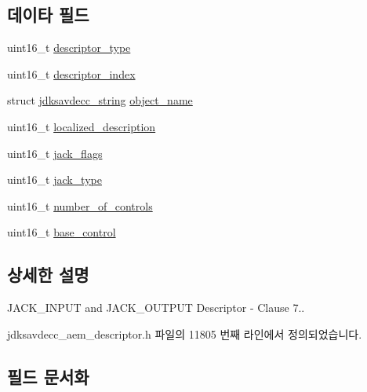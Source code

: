 \subsection*{데이타 필드}
\begin{DoxyCompactItemize}
\item 
uint16\+\_\+t \hyperlink{structjdksavdecc__descriptor__jack_ab7c32b6c7131c13d4ea3b7ee2f09b78d}{descriptor\+\_\+type}
\item 
uint16\+\_\+t \hyperlink{structjdksavdecc__descriptor__jack_a042bbc76d835b82d27c1932431ee38d4}{descriptor\+\_\+index}
\item 
struct \hyperlink{structjdksavdecc__string}{jdksavdecc\+\_\+string} \hyperlink{structjdksavdecc__descriptor__jack_a7d1f5945a13863b1762fc6db74fa8f80}{object\+\_\+name}
\item 
uint16\+\_\+t \hyperlink{structjdksavdecc__descriptor__jack_a0926f846ca65a83ad5bb06b4aff8f408}{localized\+\_\+description}
\item 
uint16\+\_\+t \hyperlink{structjdksavdecc__descriptor__jack_a000aef56fd1952d63d00e36f44c49d56}{jack\+\_\+flags}
\item 
uint16\+\_\+t \hyperlink{structjdksavdecc__descriptor__jack_afa0cc3c6946fb59ecf753ab5d0c04a7b}{jack\+\_\+type}
\item 
uint16\+\_\+t \hyperlink{structjdksavdecc__descriptor__jack_a0104bea638bdadf1a547c2b93813e22f}{number\+\_\+of\+\_\+controls}
\item 
uint16\+\_\+t \hyperlink{structjdksavdecc__descriptor__jack_af06eac7dd98377a85258308e8a25e7f2}{base\+\_\+control}
\end{DoxyCompactItemize}


\subsection{상세한 설명}
J\+A\+C\+K\+\_\+\+I\+N\+P\+UT and J\+A\+C\+K\+\_\+\+O\+U\+T\+P\+UT Descriptor -\/ Clause 7.. 

jdksavdecc\+\_\+aem\+\_\+descriptor.\+h 파일의 11805 번째 라인에서 정의되었습니다.



\subsection{필드 문서화}
